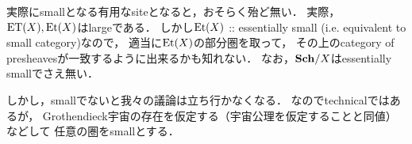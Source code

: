 \documentclass[a4paper, dvipdfmx]{jsarticle}
\begin{document}
\begin{Remark}
    実際にsmallとなる有用なsiteとなると，おそらく殆ど無い．
    実際，$\mathrm{ET}(X), \mathrm{Et}(X)$はlargeである．
    しかし$\mathrm{Et}(X)$ :: essentially small (i.e. equivalent to small category)なので，
    適当に$\mathrm{Et}(X)$の部分圏を取って，
    その上のcategory of presheavesが一致するように出来るかも知れない．
    なお，$\mathbf{Sch}/X$はessentially smallでさえ無い．

    しかし，smallでないと我々の議論は立ち行かなくなる．
    なのでtechnicalではあるが，
    Grothendieck宇宙の存在を仮定する（宇宙公理を仮定することと同値）などして
    任意の圏をsmallとする．
\end{Remark}



\end{document}
